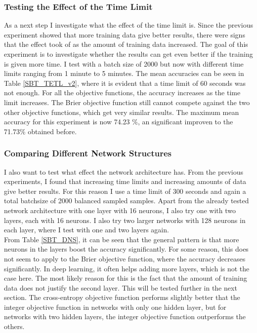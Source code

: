 \subsubsection{Testing the Effect of the Time Limit}
As a next step I investigate what the effect of the time limit is. Since the previous experiment showed that more training data give better results, there were signs that the effect took of as the amount of training data increased. The goal of this experiment is to investigate whether the results can get even better if the training is given more time. I test with a batch size of 2000 but now with different time limits ranging from 1 minute to 5 minutes. The mean accuracies can be seen in Table \ref{SBT_TETL_v2}, where it is evident that a time limit of 60 seconds was not enough. For all the objective functions, the accuracy increases as the time limit increases. The Brier objective function still cannot compete against the two other objective functions, which get very similar results. The maximum mean accuracy for this experiment is now 74.23 \%, an significant improven to the 71.73\% obtained before.   



\subsubsection{Comparing Different Network Structures}
I also want to test what effect the network architecture has. From the previous experiments, I found that increasing time limits and increasing amounts of data give better results. For this reason I use a time limit of 300 seconds and again a total batchsize of 2000 balanced sampled samples. Apart from the already tested network architecture with one layer with 16 neurons, I also try one with two layers, each with 16 neurons. I also try two larger networks with 128 neurons in each layer, where I test with one and two layers again. \\

\noindent From Table \ref{SBT_DNS}, it can be seen that the general pattern is that more neurons in the layers boost the accuracy significantly. For some reason, this does not seem to apply to the Brier objective function, where the accuracy decreases significantly. In deep learning, it often helps adding more layers, which is not the case here. The most likely reason for this is the fact that the amount of training data does not justify the second layer. This will be tested further in the next section. The cross-entropy objective function performs slightly better that the integer objective function in networks with only one hidden layer, but for networks with two hidden layers, the integer objective function outperforms the others. 



